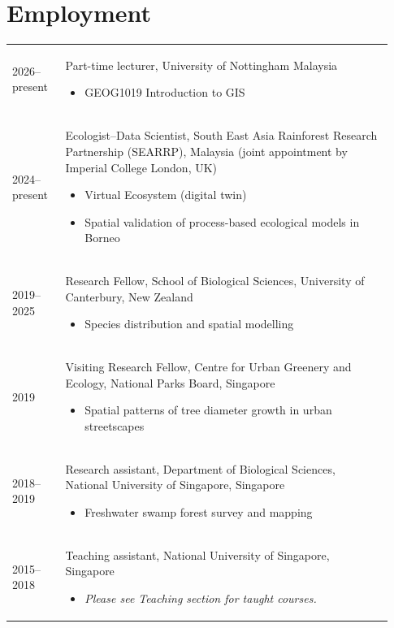 \documentclass[a4paper]{article}
\begin{document}
\section*{Employment}

\begin{tabular}{p{0.13\linewidth} p{0.8\linewidth}}

2026--present & Part-time lecturer, University of Nottingham Malaysia
\begin{itemize} 
\item GEOG1019 Introduction to GIS
\end{itemize} \\

2024--present & Ecologist--Data Scientist, South East Asia Rainforest Research Partnership (SEARRP), Malaysia (joint appointment by Imperial College London, UK)
\begin{itemize} 
\item Virtual Ecosystem (digital twin)
\item Spatial validation of process-based ecological models in Borneo
\end{itemize} \\

2019--2025 & Research Fellow, School of Biological Sciences, University of Canterbury, New Zealand
\begin{itemize} 
\item Species distribution and spatial modelling
\end{itemize} \\

2019 & Visiting Research Fellow, Centre for Urban Greenery and Ecology, National Parks Board, Singapore
\begin{itemize} 
\item Spatial patterns of tree diameter growth in urban streetscapes
\end{itemize} \\

2018--2019 & Research assistant, Department of Biological Sciences, National University of Singapore, Singapore
\begin{itemize} 
\item Freshwater swamp forest survey and mapping
\end{itemize} \\

2015--2018 & Teaching assistant, National University of Singapore, Singapore
\begin{itemize} 
\item \textit{Please see Teaching section for taught courses.}
\end{itemize} \\


\end{tabular}
\end{document}
